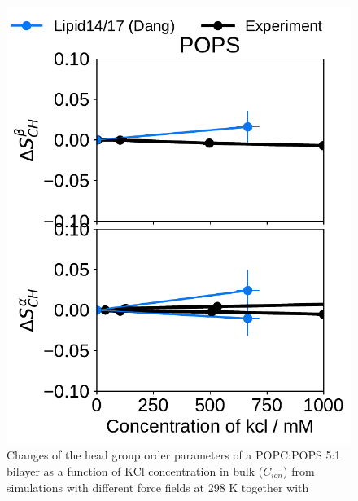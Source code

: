 \documentclass[journal=jpcbfk,manuscript=article]{achemso}
\newlength{\figwidth}
\begin{document}
\begin{figure}[htb!]
  \includegraphics[width=\figwidth]{../Fig/l17/order_parameters_changes_A-B_POPS_kcl.pdf} 
  \caption{\label{fig:delta_ordPar_KCl_l17} 
    Changes of the head group order parameters of a POPC:POPS 5:1 bilayer as a function of KCl concentration 
    in bulk ($C_{ion}$) from simulations with different force fields at 298 K together with  
  } 
\end{figure} 
 
\end{document}
